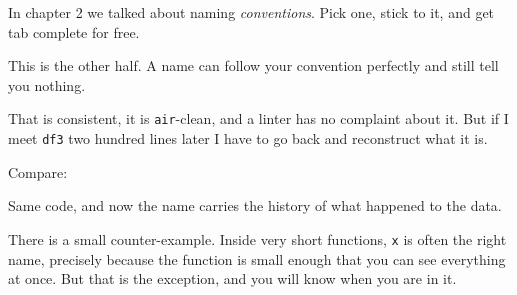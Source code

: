 \documentclass[
  letterpaper,
  justified,
  a4paper]{tufte-book}
\makeatletter
\newenvironment{Shaded}{\begin{snugshade}}{\end{snugshade}}
\newcommand{\DecValTok}[1]{\textcolor[rgb]{0.68,0.00,0.00}{#1}}
\newcommand{\FunctionTok}[1]{\textcolor[rgb]{0.28,0.35,0.67}{#1}}
\newcommand{\NormalTok}[1]{\textcolor[rgb]{0.00,0.23,0.31}{#1}}
\newcommand{\OtherTok}[1]{\textcolor[rgb]{0.00,0.23,0.31}{#1}}
\newcommand{\SpecialCharTok}[1]{\textcolor[rgb]{0.37,0.37,0.37}{#1}}
\newcommand{\StringTok}[1]{\textcolor[rgb]{0.13,0.47,0.30}{#1}}
\let\rbporigShaded\Shaded
\let\rbporigendShaded\endShaded
\renewenvironment{Shaded}{%
  \begingroup
  \ifdim\linewidth=\rbpbodywidth
    \advance\linewidth by \@tufte@overhang
    \advance\hsize by \@tufte@overhang
    \advance\columnwidth by \@tufte@overhang
  \fi
  \rbporigShaded
}{%
  \rbporigendShaded
  \endgroup
}
\makeatother
\begin{document}
In chapter 2 we talked about naming \emph{conventions}. Pick one, stick
to it, and get tab complete for free.

This is the other half. A name can follow your convention perfectly and
still tell you nothing.

\begin{Shaded}
\end{Shaded}

That is consistent, it is \texttt{air}-clean, and a linter has no
complaint about it. But if I meet \texttt{df3} two hundred lines later I
have to go back and reconstruct what it is.

Compare:

\begin{Shaded}
\end{Shaded}

Same code, and now the name carries the history of what happened to the
data.

There is a small counter-example. Inside very short functions,
\texttt{x} is often the right name, precisely because the function is
small enough that you can see everything at once. But that is the
exception, and you will know when you are in it.
\end{document}
